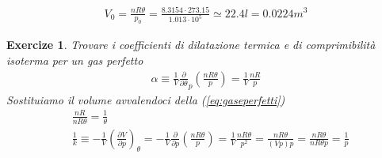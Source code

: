 \documentclass[10pt,a4paper]{article}
\newtheorem{exercize}{Exercize}
\begin{document}
\begin{align*}
V_0 = \frac{n R \theta}{p_0} = \frac{8.3154\cdot 273.15}{1.013\cdot 10^{5}}\simeq 22.4 l = 0.0224 m^3
\end{align*}
\begin{exercize}
Trovare i coefficienti di dilatazione termica e di comprimibilità isoterma per un gas perfetto
\begin{align*}
	\alpha \equiv \frac{1}{V}\frac{\partial}{\partial\theta}_p(\frac{n R \theta}{p}) = \frac{1}{V}\frac{n R}{p}
\end{align*}
Sostituiamo il volume avvalendoci della (\ref{eq:gaseperfetti})
\begin{align*}
	&\frac{n R}{n R \theta} = \frac{1}{\theta}\\
	&\frac{1}{k} \equiv -\frac{1}{V}(\frac{\partial V}{\partial p})_{\theta} = -\frac{1}{V}\frac{\partial}{\partial p}(\frac{n R \theta}{p})= \frac{1}{V}\frac{n R \theta}{p^2} = \frac{n R \theta}{(Vp) p} = \frac{n R \theta}{n R \theta p} = \frac{1}{p}
\end{align*}
\end{exercize} 
\end{document}
